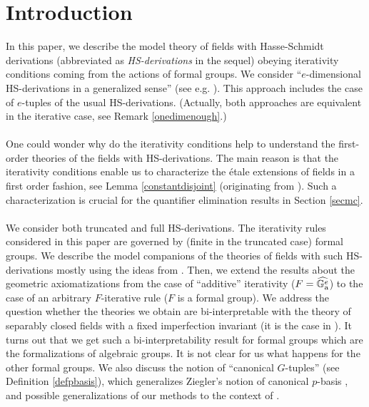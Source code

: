 \documentclass[10pt]{amsart}
\theoremstyle{definition}
\begin{document}
\section{Introduction}
\noindent
In this paper, we describe the model theory of fields with Hasse-Schmidt derivations (abbreviated as \emph{HS-derivations} in the sequel) obeying iterativity conditions coming from the actions of formal groups. We consider ``$e$-dimensional HS-derivations in a generalized sense'' (see e.g. \cite[Def. 2.12]{HrFro}). This approach includes the case of $e$-tuples of the usual HS-derivations. (Actually, both approaches are equivalent in the iterative case, see Remark \ref{onedimenough}.)
\\
\\
One could wonder why do the iterativity conditions help to understand the first-order theories of the fields with HS-derivations. The main reason is that the iterativity conditions enable us to characterize the \'{e}tale extensions of fields in a first order fashion, see Lemma \ref{constantdisjoint} (originating from \cite[Cor. 2.2]{Zieg2}). Such a characterization is crucial for the quantifier elimination results in Section \ref{secmc}.
\\
\\
We consider both truncated and full HS-derivations. The iterativity rules considered in this paper are governed by (finite in the truncated case) formal groups. We describe the model companions of the theories of fields with such HS-derivations mostly using the ideas from \cite{Zieg2}. Then, we extend the results about the geometric axiomatizations  \cite{K3} from the case  of ``additive'' iterativity ($F=\widehat{\mathbb{G}_{\rm{a}}^e}$) to the case of an arbitrary $F$-iterative rule ($F$ is a formal group). We address the question whether the theories we obtain are bi-interpretable with the theory of separably closed fields with a fixed imperfection invariant (it is the case in \cite{Zieg2}). It turns out that we get such a bi-interpretability result for formal groups which are the formalizations of algebraic groups.
It is not clear for us what happens for the other formal groups. We also discuss the notion of ``canonical $G$-tuples'' (see Definition \ref{defpbasis}), which generalizes Ziegler's notion of canonical $p$-basis \cite{Zieg2},  and possible generalizations of our methods to the context of \cite{MS}.
\end{document}
